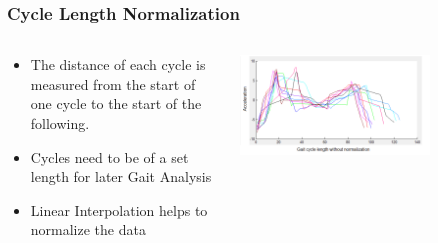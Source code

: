 \documentclass{beamer}
\begin{document}
\begin{frame}
  \frametitle{Cycle Length Normalization}
  \begin{columns}
  \begin{column}{.55\textwidth}
  \begin{itemize}
  	\item The distance of each cycle is measured from the start of one cycle to the start of the following. 
  	\linebreak
  	\item Cycles need to be of a set length for later Gait Analysis
  	\linebreak
  	\item Linear Interpolation helps to normalize the data
  \end{itemize}
  \end{column}
    \begin{column}{0.7\textwidth}
   \includegraphics[width=0.7\textwidth]{Illustrations/nonnormalized.png}
       \\
  \end{column}
  \end{columns}
\end{frame}
\end{document}
